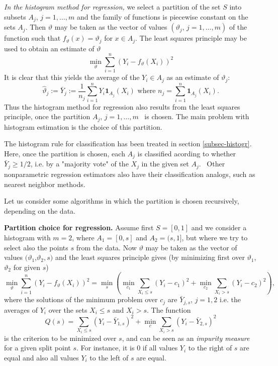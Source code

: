 \documentclass[11pt,twoside]{article}%
\theoremstyle{change}
\begin{document}
\textit{In the histogram method for regression, } we select a partition of the
set $S$ into subsets $A_{j}$, $j=1,\ldots,m$ and the family of functions is
piecewise constant on the sets $A_{j}$. Then $\vartheta$ may be taken as the
vector of values $\left(  \vartheta_{j}\text{, }j=1,\ldots,m\right)  $ of the
function such that $f_{\vartheta}(x)=\vartheta_{j}$ for $x\in A_{j}$. The
least squares principle may be used to obtain an estimate of $\vartheta$
\[
\min_{\vartheta}\sum_{i=1}^{n}\left(  Y_{i}-f_{\vartheta}(X_{i})\right)  ^{2}%
\]
It is clear that this yields the average of the $Y_{i}\in A_{j}$ as an
estimate of $\vartheta_{j}$:
\[
\hat{\vartheta}_{j}:=\bar{Y}_{j}:=\frac{1}{n_{j}}\sum_{i=1}^{n}Y_{i}%
\mathbf{1}_{A_{j}}(X_{i})\text{ where }n_{j}=\sum_{i=1}^{n}\mathbf{1}_{A_{j}%
}(X_{i}).
\]
Thus the histogram method for regression also results from the least squares
principle, once the partition $A_{j}$, $j=1,\ldots,m$ \ is chosen. The main
problem with histogram estimation is the choice of this partition.

The histogram rule for classification has been treated in section
\ref{subsec-histogr}\textit{. }Here, once the partition is chosen, each
$A_{j}$ is classified acording to whether $\bar{Y}_{j}\geq1/2$, i.e. by a
"majority vote" of the $X_{j}$ in the given set $A_{j}$. \ Other nonparametric
regression estimators also have their classification analogs, such as nearest
neighbor methods.

Let us consider some algorithms in which the partition is chosen recursively,
depending on the data. \bigskip

\textbf{Partition choice for regression.} Assume first $S=[0,1]$ and we
consider a histogram with $m=2$, where $A_{1}=[0,s]$ and $A_{2}=(s,1]$, but
where we try to select also the points $s$ from the data. Now $\vartheta$ may
be taken as the vector of values $(\vartheta_{1}$,$\vartheta_{2},s)$ and the
least squares principle gives (by minimizing first over $\vartheta_{1}%
$,$\vartheta_{2}$ for given $s$)
\[
\min_{\vartheta}\sum_{i=1}^{n}\left(  Y_{i}-f_{\vartheta}(X_{i})\right)
^{2}=\min_{s}\left(  \min_{c_{1}}\sum_{X_{i}\leq s}(Y_{i}-c_{1})^{2}%
+\min_{c_{2}}\sum_{X_{i}>s}(Y_{i}-c_{2})^{2}\right)  ,
\]
where the solutions of the minimum problem over $c_{j}$ are $\bar{Y}_{j,s}$,
$j=1,2$ i.e. the averages of $Y_{i}$ over the sets $X_{i}\leq s$ and $X_{i}>s
$. The function
\begin{equation}
Q(s)=\sum_{X_{i}\leq s}(Y_{i}-\bar{Y}_{1,s})^{2}+\min_{c}\sum_{X_{i}>s}%
(Y_{i}-\bar{Y}_{2,s})^{2}\label{impurity-analog-regress}%
\end{equation}
is the criterion to be minimized over $s$, and can be seen as an
\textit{impurity measure} for a given split point $s.$ For instance, it is $0$
if all values $Y_{i}$ to the right of $s$ are equal and also all values
$Y_{i}$ to the left of $s$ are equal.
\end{document}
